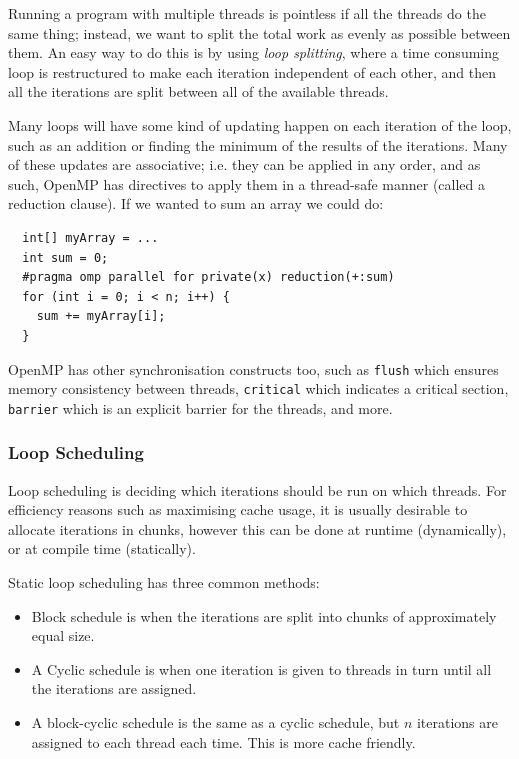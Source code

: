Running a program with multiple threads is pointless if all the
threads do the same thing; instead, we want to split the total work as
evenly as possible between them. An easy way to do this is by
using \textit{loop splitting}, where a time consuming loop is
restructured to make each iteration independent of each other, and
then all the iterations are split between all of the available threads.

Many loops will have some kind of updating happen on each iteration of
the loop, such as an addition or finding the minimum of the results of
the iterations. Many of these updates are associative; i.e. they can
be applied in any order, and as such, OpenMP has directives to apply
them in a thread-safe manner (called a reduction clause). If we wanted
to sum an array we could do:

\begin{verbatim}
  int[] myArray = ...
  int sum = 0;
  #pragma omp parallel for private(x) reduction(+:sum)
  for (int i = 0; i < n; i++) {
    sum += myArray[i];
  }
\end{verbatim}

OpenMP has other synchronisation constructs too, such
as \texttt{flush} which ensures memory consistency between
threads, \texttt{critical} which indicates a critical
section, \texttt{barrier} which is an explicit barrier for the
threads, and more.

\subsubsection{Loop Scheduling}

Loop scheduling is deciding which iterations should be run on which
threads. For efficiency reasons such as maximising cache usage, it is
usually desirable to allocate iterations in chunks, however this can
be done at runtime (dynamically), or at compile time
(statically).

Static loop scheduling has three common methods:

\begin{itemize}
\item Block schedule is when the iterations are split into chunks of
approximately equal size.
\item A Cyclic schedule is when one iteration is given to threads in
turn until all the iterations are assigned.
\item A block-cyclic schedule is the same as a cyclic schedule, but
$n$ iterations are assigned to each thread each time. This is more
cache friendly.
\end{itemize}

